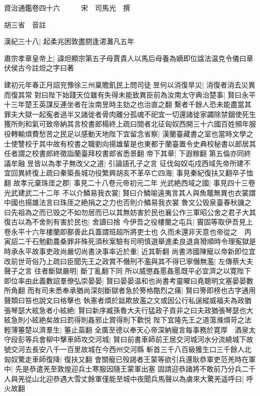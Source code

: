 資治通鑑卷四十六　　　宋　司馬光　撰

胡三省　音註

漢紀三十八|{
	起柔兆困敦盡閼逢涒灘凡五年}


肅宗孝章皇帝上|{
	諱炟顯宗第五子母賈貴人以馬后母養為嫡即位諡法温克令儀曰章伏侯古今註炟之字曰著}


建初元年春正月詔兖豫徐三州稟贍飢民上問司徒昱何以消復旱災|{
	消復者消去災異而復其常}
對曰陛下始踐天位雖有失得未能致異臣前為汝南太守典治楚事|{
	賢曰永平十三年楚王英謀反連坐者在汝南昱時主劾之也治直之翻}
繫者千餘人恐未能盡當其罪夫大獄一起寃者過半又諸徙者骨肉離分孤魂不祀宜一切還諸徙家蠲除禁錮使死生獲所則和氣可致帝納其言校書郎楊終上疏曰間者北征匈奴西開三十六國百姓頻年服役轉輸煩費愁苦之民足以感動天地陛下宜留念省察|{
	漢蘭臺藏書之室也當時文學之士使讐校于其中故有校書之職劉向揚雄輩是也東都于蘭臺置令史典校秘書以郎居其任者謂之校書郎終徵詣蘭臺拜校書郎省悉景翻}
帝下其章|{
	下遐稼翻}
第五倫亦同終議牟融昱皆以為孝子無改父之道|{
	引論語孔子之言}
征伐匈奴屯戍西域先帝所建不宜回異終復上疏曰秦築長城功役繁興胡亥不革卒亡四海|{
	事見秦紀復扶又翻卒子恤翻}
故孝元棄珠厓之郡|{
	事見二十八卷元帝初元二年}
光武絶西域之國|{
	事見四十三卷光武建武二十二年}
不以介鱗易我衣裳|{
	賢曰介鱗喻遠夷言其人與魚鼈無異也衣裳謂中國也揚雄法言曰珠厓之絶捐之之力也否則介鱗易我衣裳}
魯文公毁泉臺春秋譏之曰先祖為之而已毁之不如勿居而已以其無妨害於民也襄公作三軍昭公舍之君子大其復古以為不舍則有害於民也|{
	舍讀曰捨}
今伊吾之役樓蘭之屯兵|{
	竇固等取伊吾見上卷永平十六年樓蘭即鄯善此兵蓋謂班超所將吏士也}
久而未還非天意也帝從之　丙寅詔二千石勉勸農桑罪非殊死須秋案驗有司明慎選舉進柔良退貪猾順時令理寃獄是時承永平故事吏政尚嚴切尚書決事率近於重|{
	近其靳翻}
尚書沛國陳寵以帝新即位宜改前世苛俗乃上疏曰臣聞先王之政賞不僭刑不濫與其不得已寧僭無濫|{
	左傳蔡大夫聲子之言}
往者斷獄嚴明|{
	斷丁亂翻下同}
所以威懲姦慝姦慝既平必宜濟之以寛陛下即位率由此義數詔羣僚弘崇晏晏|{
	賢曰晏晏温和也尚書考靈曜曰堯聰明文塞晏晏數所角翻}
而有司未悉奉承猶尚深刻斷獄者急於篣格酷烈之痛|{
	賢曰篣即榜也古字通用聲類曰笞也說文曰格擊也}
執憲者煩於詆欺放濫之文或因公行私逞縱威福夫為政猶張琴瑟大絃急者小絃絶|{
	賢曰新序臧孫魯大夫行猛政子貢非之曰夫政猶張琴瑟也大絃急則小絃絶矣故曰罰得則姦邪止賞得則下歡悦}
陛下宜隆先王之道蕩滌煩苛之法輕薄箠楚以濟羣生|{
	箠止蘂翻}
全廣至德以奉天心帝深納寵言每事務於寛厚　酒泉太守段彭等兵會柳中擊車師攻交河城|{
	賢曰前書車師前王居交河城河水分流繞城下故號交河去長安八千一百里故城在今西州交河縣}
斬首三千八百級獲生口三千餘人北匈奴驚走車師復降|{
	復扶又翻}
會關寵已殁謁者王蒙等欲引兵還耿恭軍吏范羌時在軍中|{
	先是恭遣羌至敦煌迎兵士寒服因隨王蒙軍出塞}
固請迎恭諸將不敢前乃分兵二千人與羌從山北迎恭遇大雪丈餘軍僅能至城中夜聞兵馬聲以為虜來大驚羌遥呼曰|{
	呼火故翻}
